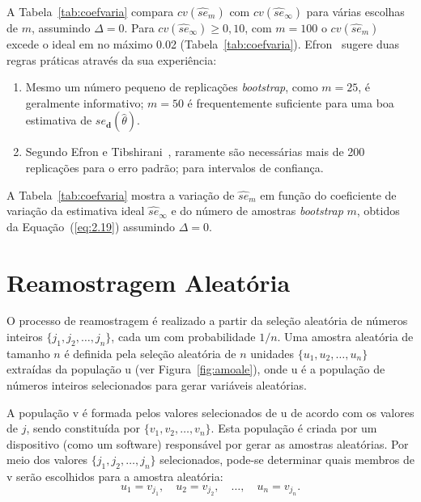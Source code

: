 A Tabela~\ref{tab:coefvaria} compara $cv(\widehat{se}_m)$ com $cv(\widehat{se}_{\infty})$ para várias escolhas de $m$, assumindo $\Delta = 0$. Para $cv(\widehat{se}_\infty)\geq 0{,}10$, com $m=100$ o $cv(\widehat{se}_m)$ excede o ideal em no máximo \num{0,02} (Tabela~\ref{tab:coefvaria}). Efron~\cite{EFRON:1993} sugere duas regras práticas através da sua experiência:

\begin{enumerate}[label=\alph*)]
    \item Mesmo um número pequeno de replicações \textit{bootstrap}, como $m = 25$, é geralmente informativo; $m = 50$ é frequentemente suficiente para uma boa estimativa de $se_{\mathbf{d}}(\widehat{\theta})$.
    \item Segundo Efron e Tibshirani~\cite{EFRON:1993}, raramente são necessárias mais de 200 replicações para o erro padrão; para intervalos de confiança.
\end{enumerate}

A Tabela~\ref{tab:coefvaria} mostra a variação de $\widehat{se}_m$ em função do coeficiente de variação da estimativa ideal $\widehat{se}_{\infty}$ e do número de amostras \textit{bootstrap} $m$, obtidos da Equação~(\ref{eq:2.19}) assumindo $\Delta = 0$.

\section{Reamostragem Aleatória}

O processo de reamostragem é realizado a partir da seleção aleatória de números inteiros $\{j_1, j_2, \ldots, j_n\}$, cada um com probabilidade $1/n$. Uma amostra aleatória de tamanho $n$ é definida pela seleção aleatória de $n$ unidades $\{u_1, u_2, \ldots, u_n\}$ extraídas da população \gls{u} (ver Figura~\ref{fig:amoale}), onde \gls{u} é a população de números inteiros selecionados para gerar variáveis aleatórias. 

A população \gls{v} é formada pelos valores selecionados de \gls{u} de acordo com os valores de $j$, sendo constituída por $\{v_1, v_2, \ldots, v_n\}$. Esta população é criada por um dispositivo (como um software) responsável por gerar as amostras aleatórias. Por meio dos valores $\{j_1, j_2, \ldots, j_n\}$ selecionados, pode-se determinar quais membros de \gls{v} serão escolhidos para a amostra aleatória:
\begin{equation*}
    u_1 = v_{j_1}, \quad u_2 = v_{j_2}, \quad \ldots, \quad u_n = v_{j_n}.
\end{equation*}

